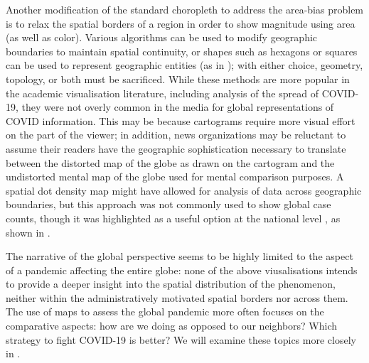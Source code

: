 \documentclass[article]{jdssv}\usepackage[]{graphicx}\usepackage[]{xcolor}
\begin{document}
Another modification of the standard choropleth to address the area-bias problem is to relax the spatial borders of a region in order to show magnitude using area (as well as color). Various algorithms can be used to modify geographic boundaries to maintain spatial continuity, or shapes such as hexagons or squares can be used to represent geographic entities (as in ); with either choice, geometry, topology, or both must be sacrificed.  While these methods are more popular in the academic visualisation literature, including analysis of the spread of COVID-19\citep{yalcinMappingGlobalSpatiotemporal2022}, they were not overly common in the media for global representations of COVID information. This may be because cartograms require more visual effort on the part of the viewer; in addition, news organizations may be reluctant to assume their readers have the geographic sophistication necessary to translate between the distorted map of the globe as drawn on the cartogram and the undistorted mental map of the globe used for mental comparison purposes. 
A spatial dot density map might have allowed for analysis of data across geographic boundaries, but this approach was not commonly used to show global case counts, though it was highlighted as a useful option at the national level \citep{fieldMappingCoronavirusResponsibly}, as shown in .

The narrative of the global perspective seems to be highly limited to the aspect of a pandemic affecting the entire globe: none of the above viusalisations intends to provide a deeper insight into the spatial distribution of the phenomenon, neither within the administratively motivated spatial borders nor across them. 
The use of maps to assess the global pandemic more often focuses on the comparative aspects: how are we doing as opposed to our neighbors? Which strategy to fight COVID-19 is better? 
We will examine these topics more closely in .
\end{document}
